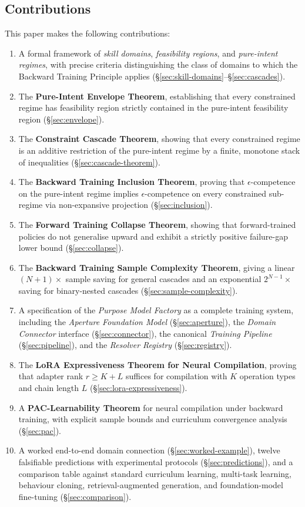 \documentclass[twocolumn,11pt,a4paper]{article}
\begin{document}
\subsection{Contributions}
\label{sec:contributions}

This paper makes the following contributions:

\begin{enumerate}[leftmargin=*,itemsep=3pt]
\item A formal framework of \emph{skill domains}, \emph{feasibility regions}, and \emph{pure-intent regimes}, with precise criteria distinguishing the class of domains to which the Backward Training Principle applies (\S\ref{sec:skill-domains}--\S\ref{sec:cascades}).
\item The \textbf{Pure-Intent Envelope Theorem}, establishing that every constrained regime has feasibility region strictly contained in the pure-intent feasibility region (\S\ref{sec:envelope}).
\item The \textbf{Constraint Cascade Theorem}, showing that every constrained regime is an additive restriction of the pure-intent regime by a finite, monotone stack of inequalities (\S\ref{sec:cascade-theorem}).
\item The \textbf{Backward Training Inclusion Theorem}, proving that $\epsilon$-competence on the pure-intent regime implies $\epsilon$-competence on every constrained sub-regime via non-expansive projection (\S\ref{sec:inclusion}).
\item The \textbf{Forward Training Collapse Theorem}, showing that forward-trained policies do not generalise upward and exhibit a strictly positive failure-gap lower bound (\S\ref{sec:collapse}).
\item The \textbf{Backward Training Sample Complexity Theorem}, giving a linear $(N+1)\times$ sample saving for general cascades and an exponential $2^{N-1}\times$ saving for binary-nested cascades (\S\ref{sec:sample-complexity}).
\item A specification of the \emph{Purpose Model Factory} as a complete training system, including the \emph{Aperture Foundation Model} (\S\ref{sec:aperture}), the \emph{Domain Connector} interface (\S\ref{sec:connector}), the canonical \emph{Training Pipeline} (\S\ref{sec:pipeline}), and the \emph{Resolver Registry} (\S\ref{sec:registry}).
\item The \textbf{LoRA Expressiveness Theorem for Neural Compilation}, proving that adapter rank $r \geq K + L$ suffices for compilation with $K$ operation types and chain length $L$ (\S\ref{sec:lora-expressiveness}).
\item A \textbf{PAC-Learnability Theorem} for neural compilation under backward training, with explicit sample bounds and curriculum convergence analysis (\S\ref{sec:pac}).
\item A worked end-to-end domain connection (\S\ref{sec:worked-example}), twelve falsifiable predictions with experimental protocols (\S\ref{sec:predictions}), and a comparison table against standard curriculum learning, multi-task learning, behaviour cloning, retrieval-augmented generation, and foundation-model fine-tuning (\S\ref{sec:comparison}).
\end{enumerate}
\end{document}
